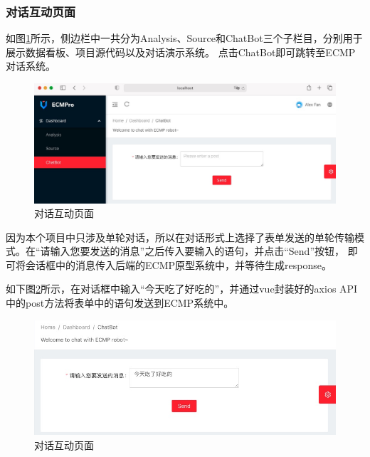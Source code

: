 \documentclass[supercite]{HustGraduPaper}
\theoremstyle{definition}
\begin{document}
\subsubsection{对话互动页面}
如图\ref{Fig.chatbot}所示，侧边栏中一共分为Analysis、Source和ChatBot三个子栏目，分别用于展示数据看板、项目源代码以及对话演示系统。
点击ChatBot即可跳转至ECMP对话系统。
\begin{figure}[H] %
  \centering %
  \includegraphics[width=1\textwidth]{images/Chatbot.jpg} %
  \caption{对话互动页面} %
  \label{Fig.chatbot} %
\end{figure}

因为本个项目中只涉及单轮对话，所以在对话形式上选择了表单发送的单轮传输模式。在“请输入您要发送的消息”之后传入要输入的语句，并点击“Send”按钮，
即可将会话框中的消息传入后端的ECMP原型系统中，并等待生成response。

如下图\ref{Fig.chatpost}所示，在对话框中输入“今天吃了好吃的”，并通过vue封装好的axios API中的post方法将表单中的语句发送到ECMP系统中。
\begin{figure}[H] %
  \centering %
  \includegraphics[width=1\textwidth]{images/chatpost.jpg} %
  \caption{对话互动页面} %
  \label{Fig.chatpost} %
\end{figure}
\end{document}
